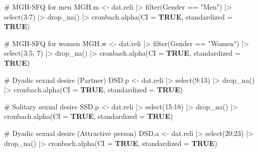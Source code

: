 \documentclass[
  bookmarksnumbered]{article}
\newenvironment{Shaded}{\begin{snugshade}}{\end{snugshade}}
\newcommand{\AttributeTok}[1]{\textcolor[rgb]{0.80,0.80,0.80}{#1}}
\newcommand{\CommentTok}[1]{\textcolor[rgb]{0.50,0.62,0.50}{#1}}
\newcommand{\ConstantTok}[1]{\textcolor[rgb]{0.86,0.64,0.64}{\textbf{#1}}}
\newcommand{\DecValTok}[1]{\textcolor[rgb]{0.86,0.86,0.80}{#1}}
\newcommand{\FunctionTok}[1]{\textcolor[rgb]{0.94,0.94,0.56}{#1}}
\newcommand{\NormalTok}[1]{\textcolor[rgb]{0.80,0.80,0.80}{#1}}
\newcommand{\OtherTok}[1]{\textcolor[rgb]{0.94,0.94,0.56}{#1}}
\newcommand{\SpecialCharTok}[1]{\textcolor[rgb]{0.86,0.64,0.64}{#1}}
\newcommand{\StringTok}[1]{\textcolor[rgb]{0.80,0.58,0.58}{#1}}
\begin{document}
\begin{Shaded}
\begin{Highlighting}[]
\CommentTok{\# MGH{-}SFQ for men}
\NormalTok{MGH.m }\OtherTok{\textless{}{-}}\NormalTok{ dat.reli }\SpecialCharTok{|\textgreater{}}
  \FunctionTok{filter}\NormalTok{(Gender }\SpecialCharTok{==} \StringTok{"Men"}\NormalTok{) }\SpecialCharTok{|\textgreater{}}
  \FunctionTok{select}\NormalTok{(}\DecValTok{3}\SpecialCharTok{:}\DecValTok{7}\NormalTok{) }\SpecialCharTok{|\textgreater{}}
  \FunctionTok{drop\_na}\NormalTok{() }\SpecialCharTok{|\textgreater{}}
  \FunctionTok{cronbach.alpha}\NormalTok{(}\AttributeTok{CI =} \ConstantTok{TRUE}\NormalTok{, }\AttributeTok{standardized =} \ConstantTok{TRUE}\NormalTok{)}

\CommentTok{\# MGH{-}SFQ for women}
\NormalTok{MGH.w }\OtherTok{\textless{}{-}}\NormalTok{ dat.reli }\SpecialCharTok{|\textgreater{}}
  \FunctionTok{filter}\NormalTok{(Gender }\SpecialCharTok{==} \StringTok{"Women"}\NormalTok{) }\SpecialCharTok{|\textgreater{}}
  \FunctionTok{select}\NormalTok{(}\DecValTok{3}\SpecialCharTok{:}\DecValTok{5}\NormalTok{, }\DecValTok{7}\NormalTok{) }\SpecialCharTok{|\textgreater{}}
  \FunctionTok{drop\_na}\NormalTok{() }\SpecialCharTok{|\textgreater{}}
  \FunctionTok{cronbach.alpha}\NormalTok{(}\AttributeTok{CI =} \ConstantTok{TRUE}\NormalTok{, }\AttributeTok{standardized =} \ConstantTok{TRUE}\NormalTok{)}

\CommentTok{\# Dyadic sexual desire (Partner)}
\NormalTok{DSD.p }\OtherTok{\textless{}{-}}\NormalTok{ dat.reli }\SpecialCharTok{|\textgreater{}}
  \FunctionTok{select}\NormalTok{(}\DecValTok{9}\SpecialCharTok{:}\DecValTok{13}\NormalTok{) }\SpecialCharTok{|\textgreater{}}
  \FunctionTok{drop\_na}\NormalTok{() }\SpecialCharTok{|\textgreater{}}
  \FunctionTok{cronbach.alpha}\NormalTok{(}\AttributeTok{CI =} \ConstantTok{TRUE}\NormalTok{, }\AttributeTok{standardized =} \ConstantTok{TRUE}\NormalTok{)}

\CommentTok{\# Solitary sexual desire}
\NormalTok{SSD.p }\OtherTok{\textless{}{-}}\NormalTok{ dat.reli }\SpecialCharTok{|\textgreater{}}
  \FunctionTok{select}\NormalTok{(}\DecValTok{15}\SpecialCharTok{:}\DecValTok{18}\NormalTok{) }\SpecialCharTok{|\textgreater{}}
  \FunctionTok{drop\_na}\NormalTok{() }\SpecialCharTok{|\textgreater{}}
  \FunctionTok{cronbach.alpha}\NormalTok{(}\AttributeTok{CI =} \ConstantTok{TRUE}\NormalTok{, }\AttributeTok{standardized =} \ConstantTok{TRUE}\NormalTok{)}

\CommentTok{\# Dyadic sexual desire (Attractive person)}
\NormalTok{DSD.a }\OtherTok{\textless{}{-}}\NormalTok{ dat.reli }\SpecialCharTok{|\textgreater{}}
  \FunctionTok{select}\NormalTok{(}\DecValTok{20}\SpecialCharTok{:}\DecValTok{23}\NormalTok{) }\SpecialCharTok{|\textgreater{}}
  \FunctionTok{drop\_na}\NormalTok{() }\SpecialCharTok{|\textgreater{}}
  \FunctionTok{cronbach.alpha}\NormalTok{(}\AttributeTok{CI =} \ConstantTok{TRUE}\NormalTok{, }\AttributeTok{standardized =} \ConstantTok{TRUE}\NormalTok{)}


\end{Highlighting}
\end{Shaded}
\end{document}
